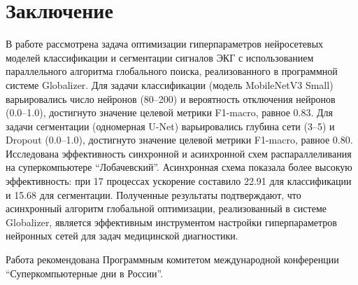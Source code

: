 \documentclass[10pt,a4paper]{book}
\begin{document}
\section{Заключение}
\label{sec-conclusion}

В работе рассмотрена задача оптимизации гиперпараметров нейросетевых моделей классификации и сегментации сигналов ЭКГ с использованием параллельного алгоритма глобального поиска, реализованного в программной системе Globalizer. Для задачи классификации (модель MobileNetV3 Small) варьировались число нейронов (80--200) и вероятность отключения нейронов (0.0--1.0), достигнуто значение целевой метрики F1-macro, равное 0.83. Для задачи сегментации (одномерная U-Net) варьировались глубина сети (3--5) и Dropout (0.0--1.0), достигнуто значение целевой метрики F1-macro, равное 0.80. Исследована эффективность синхронной и асинхронной схем распараллеливания на суперкомпьютере ``Лобачевский''. Асинхронная схема показала более высокую эффективность: при 17 процессах ускорение составило 22.91 для классификации и 15.68 для сегментации. Полученные результаты подтверждают, что асинхронный алгоритм глобальной оптимизации, реализованный в системе Globalizer, является эффективным инструментом настройки гиперпараметров нейронных сетей для задач медицинской диагностики.

\bigskip
Работа рекомендована Программным комитетом международной конференции ``Суперкомпьютерные дни в России''.

\vspace*{10mm plus 2mm minus 2mm}

\LITERRUS



\end{document}
